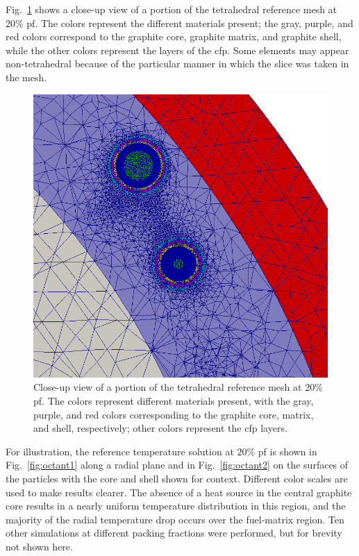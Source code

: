 Fig.\ \ref{fig:pebble_octant_mesh} shows a close-up view of a portion of the tetrahedral reference mesh at 20\% \gls{pf}. The colors represent the different materials present; the gray, purple, and red colors correspond to the graphite core, graphite matrix, and graphite shell, while the other colors represent the layers of the \gls{cfp}. Some elements may appear non-tetrahedral because of the particular manner in which the slice was taken in the mesh.

\begin{figure}[h!]
\centering
\includegraphics[width=0.4\linewidth]{figs/pbfhr_pebble_mesh_cross_section.png}
\caption{Close-up view of a portion of the tetrahedral reference mesh at 20\% \gls{pf}. The colors represent different materials present, with the gray, purple, and red colors corresponding to the graphite core, matrix, and shell, respectively; other colors represent the \gls{cfp} layers.}
\label{fig:pebble_octant_mesh}
\end{figure}

For illustration, the reference temperature solution at \(20\)\% \gls{pf} is shown in Fig.\ \ref{fig:octant1} along a radial plane and in Fig.\ \ref{fig:octant2} on the surfaces of the particles with the core and shell shown for context. Different color scales are used to make results clearer. The absence of a heat source in the central graphite core results in a nearly uniform temperature distribution in this region, and the majority of the radial temperature drop occurs over the fuel-matrix region. Ten other simulations at different packing fractions were performed, but for brevity not shown here.

